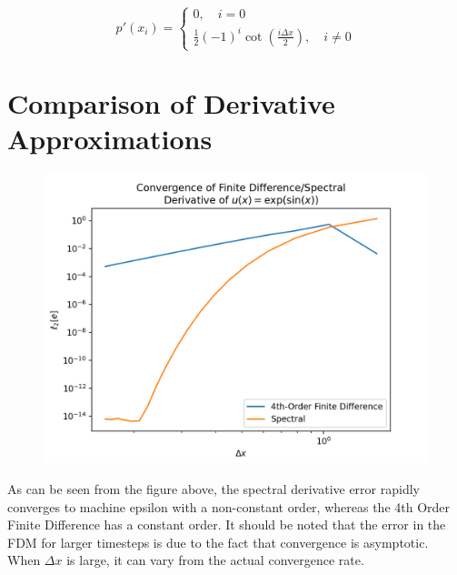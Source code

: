 \documentclass[10pt, reqno]{amsart}
\begin{document}
\begin{multicols}{2}
    \begin{equation}
        p'(x_i) = \begin{cases}
            0, \quad i = 0 \\
            \frac{1}{2} (-1)^i \cot \left( \frac{i \Delta x}{2} \right), \quad i \neq 0 \end{cases}
    \end{equation}

    \section{Comparison of Derivative Approximations}

    \begin{figure}[H]
        \centering
        \includegraphics[width=1\linewidth]{Convergence of Derivatives.png}
    \end{figure}
    As can be seen from the figure above, the spectral derivative error rapidly converges to machine epsilon with a non-constant order, whereas the 4th Order Finite Difference has a constant order. It should be noted that the error in the FDM for larger timesteps is due to the fact that convergence is asymptotic. When $\Delta x$ is large, it can vary from the actual convergence rate.
\end{multicols}
\end{document}
